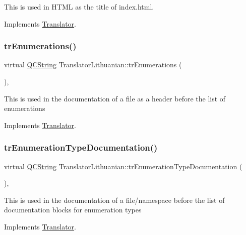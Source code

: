 This is used in H\+T\+ML as the title of index.\+html. 

Implements \mbox{\hyperlink{class_translator}{Translator}}.

\mbox{\label{class_translator_lithuanian_adda1a1847d611ddf4523301c4170dda4}} 
\subsubsection{\texorpdfstring{trEnumerations()}{trEnumerations()}}
{\footnotesize\ttfamily virtual \mbox{\hyperlink{class_q_c_string}{Q\+C\+String}} Translator\+Lithuanian\+::tr\+Enumerations (\begin{DoxyParamCaption}{ }\end{DoxyParamCaption})\hspace{0.3cm}{\ttfamily [inline]}, {\ttfamily [virtual]}}

This is used in the documentation of a file as a header before the list of enumerations 

Implements \mbox{\hyperlink{class_translator}{Translator}}.

\mbox{\label{class_translator_lithuanian_a2a5dee2b3aed0ccd03b824199d0692a2}} 
\subsubsection{\texorpdfstring{trEnumerationTypeDocumentation()}{trEnumerationTypeDocumentation()}}
{\footnotesize\ttfamily virtual \mbox{\hyperlink{class_q_c_string}{Q\+C\+String}} Translator\+Lithuanian\+::tr\+Enumeration\+Type\+Documentation (\begin{DoxyParamCaption}{ }\end{DoxyParamCaption})\hspace{0.3cm}{\ttfamily [inline]}, {\ttfamily [virtual]}}

This is used in the documentation of a file/namespace before the list of documentation blocks for enumeration types 

Implements \mbox{\hyperlink{class_translator}{Translator}}.

